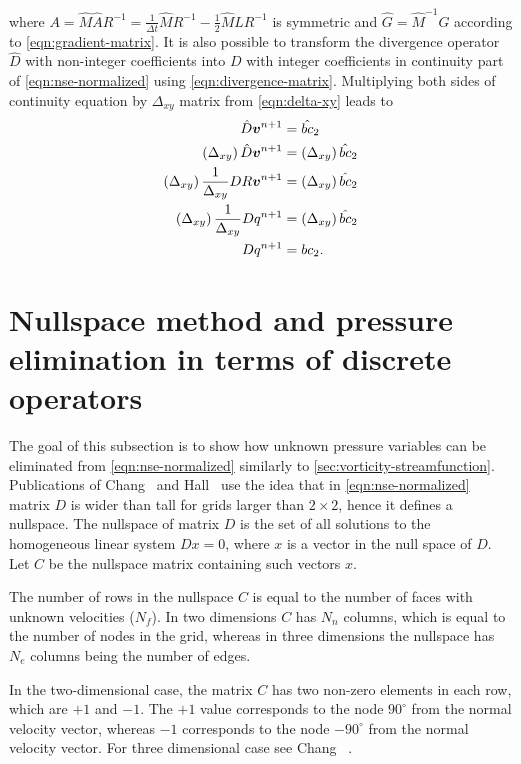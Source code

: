 \documentclass{article}
\numberwithin{equation}{section}
\begin{document}
where $A=\hat{M}\hat{A}R^{-1}=\frac{1}{\Delta t}\hat{M}R^{-1}-\frac{1}{2}\hat{M}\hat{L}R^{-1}$ is symmetric and $\hat{G}=\hat{M}^{-1}G$ according to \cref{eqn:gradient-matrix}. It is also possible to transform the divergence operator $\hat{D}$ with non-integer coefficients into $D$ with integer coefficients in continuity part of \cref{eqn:nse-normalized} using  \cref{eqn:divergence-matrix}. Multiplying both sides of continuity equation by $\Delta _{xy}$ matrix from \cref{eqn:delta-xy} leads to 
\begin{align*}
	\hat{D}\boldsymbol{v}^{n+1}&= \hat{bc}_2\notag\\
	\left(\Delta_{xy} \right)\hat{D}\boldsymbol{v}^{n+1}&=\left ( \Delta_{xy}\right ) \hat{bc}_2\notag\\
	\left(\Delta_{xy}\right)\frac{1}{\Delta _{xy}}{D}R\boldsymbol{v}^{n+1}&=\left ( \Delta_{xy}\right ) \hat{bc}_2\notag\\
	\left(\Delta_{xy}\right)\frac{1}{\Delta_{xy}}{D}q^{n+1}&=\left ( \Delta_{xy}\right ) \hat{bc}_2\notag\\
	D{q}^{n+1}&=bc_2.
\end{align*}




\pagebreak
\section{Nullspace method and pressure elimination in terms of discrete operators}\label{sec:nullspace-method}

The goal of this subsection is to show how unknown pressure variables can be eliminated from \cref{eqn:nse-normalized} similarly to \cref{sec:vorticity-streamfunction}. Publications of Chang~\cite{Chang:2002} and Hall~\cite{Hall:1980} use the idea that in \cref{eqn:nse-normalized} matrix $D$ is wider than tall for grids larger than $2\times 2$, hence it defines a nullspace. The nullspace of matrix $D$ is the set of all solutions to the homogeneous linear system $Dx = 0$, where $x$ is a vector in the null space of $D$. Let $C$ be the nullspace matrix containing such vectors $x$. 

The number of rows in the nullspace $C$ is equal to the number of faces with unknown velocities ($N_f$). In two dimensions $C$ has $N_n$ columns, which is equal to the number of nodes in the grid, whereas in three dimensions the nullspace has $N_e$ columns being the number of edges. 

In the two-dimensional case, the matrix $C$ has two non-zero elements in each row, which are $+1$ and $-1$. The $+1$ value corresponds to the node $90^\circ$ from the normal velocity vector, whereas $-1$ corresponds to the node $-90^\circ$ from the normal velocity vector.  For three dimensional case see Chang ~\cite{Chang:2002}.
\end{document}
